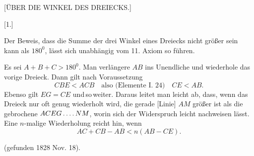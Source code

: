 \clearpage{}
\begin{center}
[ÜBER DIE WINKEL DES DREIECKS.]
\end{center}

\begin{center}
[1.]
\end{center}

Der Beweis, dass die Summe der drei Winkel eines Dreiecks nicht größer sein
kann als $180^{0}$, lässt sich unabhängig vom 11. Axiom so führen.



\begin{center}

\end{center}

Es sei $A+B+C>180^{0}$. Man verlängere $AB$ ins Unendliche und wiederhole das
vorige Dreieck. Dann gilt nach Voraussetzung
\[
CBE < ACB \quad \text{also (Elemente I. 24)} \quad CE < AB.
\]
Ebenso gilt $EG=CE$ und\,so\,weiter. Daraus leitet man leicht ab, dass, wenn das
Dreieck nur oft genug wiederholt wird, die gerade [Linie] $AM$ größer ist
als die gebrochene $ACEG\mathinner{.\,.\,.\,.}NM$, worin sich der Widerspruch leicht
nachweisen lässt. Eine $n$-malige Wiederholung reicht hin, wenn
\[AC+CB-AB < n(AB-CE).\]

(gefunden 1828 Nov. 18).

